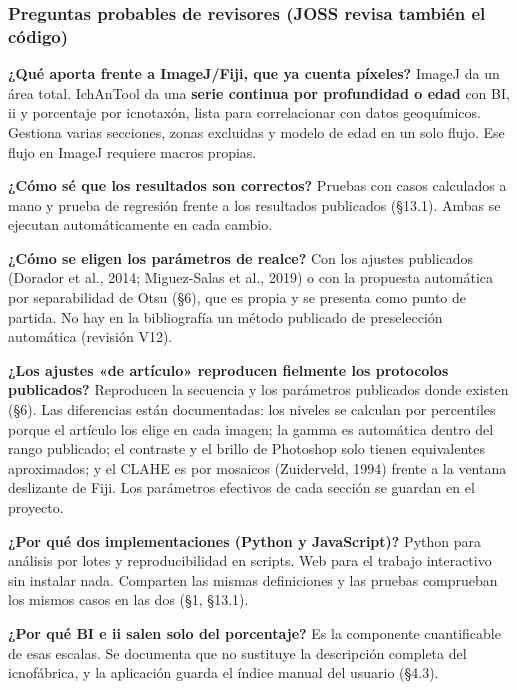 \documentclass[
  10pt,
]{article}
\begin{document}
\hypertarget{preguntas-probables-de-revisores-joss-revisa-tambiuxe9n-el-cuxf3digo}{%
\subsubsection{Preguntas probables de revisores (JOSS revisa también el
código)}\label{preguntas-probables-de-revisores-joss-revisa-tambiuxe9n-el-cuxf3digo}}

\textbf{¿Qué aporta frente a ImageJ/Fiji, que ya cuenta píxeles?} ImageJ
da un área total. IchAnTool da una \textbf{serie continua por
profundidad o edad} con BI, ii y porcentaje por icnotaxón, lista para
correlacionar con datos geoquímicos. Gestiona varias secciones, zonas
excluidas y modelo de edad en un solo flujo. Ese flujo en ImageJ
requiere macros propias.

\textbf{¿Cómo sé que los resultados son correctos?} Pruebas con casos
calculados a mano y prueba de regresión frente a los resultados
publicados (§13.1). Ambas se ejecutan automáticamente en cada cambio.

\textbf{¿Cómo se eligen los parámetros de realce?} Con los ajustes
publicados (Dorador et al., 2014; Miguez-Salas et al., 2019) o con la
propuesta automática por separabilidad de Otsu (§6), que es propia y se
presenta como punto de partida. No hay en la bibliografía un método
publicado de preselección automática (revisión V12).

\textbf{¿Los ajustes «de artículo» reproducen fielmente los protocolos
publicados?} Reproducen la secuencia y los parámetros publicados donde
existen (§6). Las diferencias están documentadas: los niveles se
calculan por percentiles porque el artículo los elige en cada imagen; la
gamma es automática dentro del rango publicado; el contraste y el brillo
de Photoshop solo tienen equivalentes aproximados; y el CLAHE es por
mosaicos (Zuiderveld, 1994) frente a la ventana deslizante de Fiji. Los
parámetros efectivos de cada sección se guardan en el proyecto.

\textbf{¿Por qué dos implementaciones (Python y JavaScript)?} Python
para análisis por lotes y reproducibilidad en scripts. Web para el
trabajo interactivo sin instalar nada. Comparten las mismas definiciones
y las pruebas comprueban los mismos casos en las dos (§1, §13.1).

\textbf{¿Por qué BI e ii salen solo del porcentaje?} Es la componente
cuantificable de esas escalas. Se documenta que no sustituye la
descripción completa del icnofábrica, y la aplicación guarda el índice
manual del usuario (§4.3).
\end{document}
